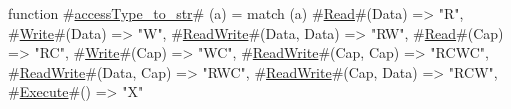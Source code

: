 function #\hyperref[sailRISCVzaccessTypezytozystr]{accessType\_to\_str}# (a) =
  match (a) {
    #\hyperref[sailRISCVzRead]{Read}#(Data)            => "R",
    #\hyperref[sailRISCVzWrite]{Write}#(Data)           => "W",
    #\hyperref[sailRISCVzReadWrite]{ReadWrite}#(Data, Data) => "RW",
    #\hyperref[sailRISCVzRead]{Read}#(Cap)             => "RC",
    #\hyperref[sailRISCVzWrite]{Write}#(Cap)            => "WC",
    #\hyperref[sailRISCVzReadWrite]{ReadWrite}#(Cap, Cap)   => "RCWC",
    #\hyperref[sailRISCVzReadWrite]{ReadWrite}#(Data, Cap)  => "RWC",
    #\hyperref[sailRISCVzReadWrite]{ReadWrite}#(Cap, Data)  => "RCW",
    #\hyperref[sailRISCVzExecute]{Execute}#()             => "X"
  }
